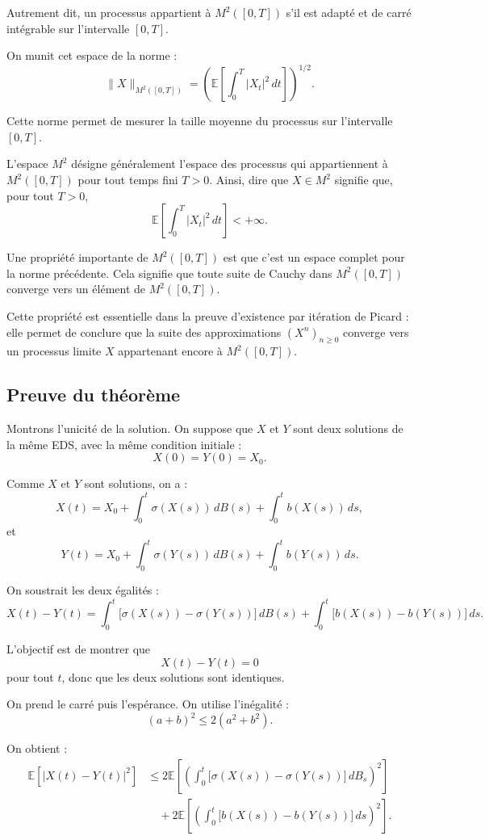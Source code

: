 \documentclass[12pt,a4paper]{article}
\theoremstyle{remark}
\begin{document}
Autrement dit, un processus appartient à $M^2([0,T])$ s’il est adapté et de carré intégrable sur l’intervalle $[0,T]$.

On munit cet espace de la norme :
\[
\|X\|_{M^2([0,T])}
=
\left(
\mathbb{E}\left[\int_0^T |X_t|^2\,dt\right]
\right)^{1/2}.
\]

Cette norme permet de mesurer la taille moyenne du processus sur l’intervalle $[0,T]$.

L’espace $M^2$ désigne généralement l’espace des processus qui appartiennent à $M^2([0,T])$ pour tout temps fini $T>0$. Ainsi, dire que $X \in M^2$ signifie que, pour tout $T>0$,
\[
\mathbb{E}\left[\int_0^T |X_t|^2\,dt\right] < +\infty.
\]

Une propriété importante de $M^2([0,T])$ est que c’est un espace complet pour la norme précédente. Cela signifie que toute suite de Cauchy dans $M^2([0,T])$ converge vers un élément de $M^2([0,T])$.

Cette propriété est essentielle dans la preuve d’existence par itération de Picard : elle permet de conclure que la suite des approximations $(X^n)_{n\geq 0}$ converge vers un processus limite $X$ appartenant encore à $M^2([0,T])$.

\subsection{Preuve du théorème}

Montrons l'unicité de la solution. On suppose que $X$ et $Y$ sont deux solutions de la même EDS, avec la même condition initiale :
\[
X(0)=Y(0)=X_0.
\]

Comme $X$ et $Y$ sont solutions, on a :
\[
X(t)
=
X_0
+
\int_0^t \sigma(X(s))\,dB(s)
+
\int_0^t b(X(s))\,ds,
\]
et
\[
Y(t)
=
X_0
+
\int_0^t \sigma(Y(s))\,dB(s)
+
\int_0^t b(Y(s))\,ds.
\]

On soustrait les deux égalités :
\[
X(t)-Y(t)
=
\int_0^t \bigl[\sigma(X(s))-\sigma(Y(s))\bigr]\,dB(s)
+
\int_0^t \bigl[b(X(s))-b(Y(s))\bigr]\,ds.
\]

L’objectif est de montrer que
\[
X(t)-Y(t)=0
\]
pour tout $t$, donc que les deux solutions sont identiques.

On prend le carré puis l’espérance. On utilise l’inégalité :
\[
(a+b)^2 \leq 2(a^2+b^2).
\]

On obtient :
\[
\begin{aligned}
\mathbb{E}\left[|X(t)-Y(t)|^2\right]
&\leq
2\mathbb{E}\left[
\left(
\int_0^t
\bigl[\sigma(X(s))-\sigma(Y(s))\bigr]\,dB_s
\right)^2
\right] \\
&\quad+
2\mathbb{E}\left[
\left(
\int_0^t
\bigl[b(X(s))-b(Y(s))\bigr]\,ds
\right)^2
\right].
\end{aligned}
\]
\end{document}

